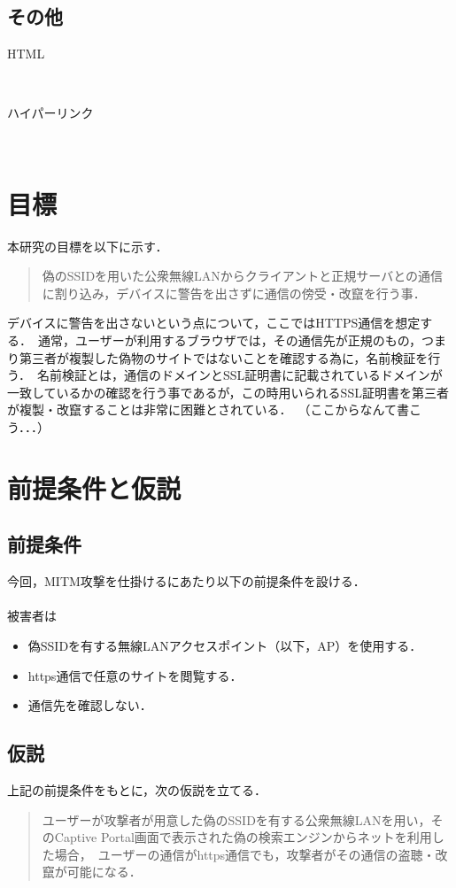 \documentclass[dvipdfmx]{jsarticle}
\begin{document}
    \subsection{その他}
    \begin{description}
        \item[HTML]\mbox{}\\
        \item[ハイパーリンク]\mbox{}\\  
    \end{description}
    \section{目標}
    本研究の目標を以下に示す．
    \begin{quote}
        偽のSSIDを用いた公衆無線LANからクライアントと正規サーバとの通信に割り込み，デバイスに警告を出さずに通信の傍受・改竄を行う事．\
    \end{quote}
    デバイスに警告を出さないという点について，ここではHTTPS通信を想定する．\
    通常，ユーザーが利用するブラウザでは，その通信先が正規のもの，つまり第三者が複製した偽物のサイトではないことを確認する為に，名前検証を行う．\
    名前検証とは，通信のドメインとSSL証明書に記載されているドメインが一致しているかの確認を行う事であるが，この時用いられるSSL証明書を第三者が複製・改竄することは非常に困難とされている．\
    （ここからなんて書こう．．．）
    \section{前提条件と仮説}
    \subsection{前提条件}
    今回，MITM攻撃を仕掛けるにあたり以下の前提条件を設ける．\\
    \\
    被害者は
    \begin{itemize}
        \item 偽SSIDを有する無線LANアクセスポイント（以下，AP）を使用する．
        \item https通信で任意のサイトを閲覧する．
        \item 通信先を確認しない．
    \end{itemize}
    \subsection{仮説}
    上記の前提条件をもとに，次の仮説を立てる．
    \begin{quote}
        ユーザーが攻撃者が用意した偽のSSIDを有する公衆無線LANを用い，そのCaptive Portal画面で表示された偽の検索エンジンからネットを利用した場合，\
        ユーザーの通信がhttps通信でも，攻撃者がその通信の盗聴・改竄が可能になる．
    \end{quote}
\end{document}
